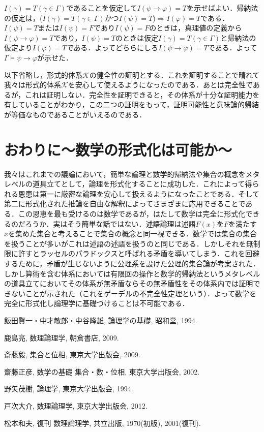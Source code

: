 \documentclass[10pt,b5paper,papersize,dvipdfmx]{jsbook}
\begin{document}
$I(\gamma)=T(\gamma \in \Gamma)$であることを仮定して$I(\psi \to \varphi)=T$を示せばよい．帰納法の仮定は，($I(\gamma)=T(\gamma \in \Gamma)$かつ$I(\psi)=T$)$\Rightarrow$$I(\varphi)=T$である．$I(\psi) = T$または$I(\psi) = F$であり$I(\psi) = F$のときは，真理値の定義から$I(\psi \to \varphi)=T$であり，$I(\psi) = T$のときは仮定$I(\gamma)=T(\gamma \in \Gamma)$と帰納法の仮定より$I(\varphi)=T$である．よってどちらにしろ$I(\psi \to \varphi)=T$である．よって$\Gamma \models \psi \to \varphi$が示せた．\par
以下省略し，形式的体系$\mathcal K$の健全性の証明とする．これを証明することで晴れて我々は形式的体系$\mathcal K$を安心して使えるようになったのである．あとは完全性であるが，これは証明しない．完全性を証明できると，その体系が十分な証明能力を有していることがわかり，この二つの証明をもって，証明可能性と意味論的帰結が等価なものであることがいえるのである．

\section{おわりに～数学の形式化は可能か～}
我々はこれまでの議論において，簡単な論理と数学的帰納法や集合の概念をメタレベルの道具立てとして，論理を形式化することに成功した．これによって得られる恩恵は第一に厳密な論理を安心して扱えるようになったことである．そして第二に形式化された推論を自由な解釈によってさまざまに応用できることである．この恩恵を最も受けるのは数学であるが，はたして数学は完全に形式化できるのだろうか．実はそう簡単な話ではない．述語論理は述語$F(x)$を$F$を満たす$x$を集めた集合と考えることで集合の概念と同一視できる．数学では集合の集合を扱うことが多いがこれは述語の述語を扱うのと同じである．しかしそれを無制限に許すとラッセルのパラドックスと呼ばれる矛盾を導いてしまう．これを回避するために，矛盾が生じないように公理系を設けた公理的集合論が考案された．しかし算術を含む体系においては有限回の操作と数学的帰納法というメタレベルの道具立てにおいてその体系が無矛盾ならその無矛盾性をその体系内では証明できないことが示された（これをゲーデルの不完全性定理という）．よって数学を完全に形式化し論理学に基礎づけることは不可能である．

\begin{thebibliography}{99}
  \item 飯田賢一・中才敏郎・中谷隆雄, 論理学の基礎, 昭和堂, 1994.
  \item 鹿島亮, 数理論理学, 朝倉書店, 2009.
  \item 斎藤毅, 集合と位相, 東京大学出版会, 2009.
  \item 齋藤正彦, 数学の基礎 集合・数・位相, 東京大学出版会, 2002.
  \item 野矢茂樹, 論理学, 東京大学出版会, 1994.
  \item 戸次大介, 数理論理学, 東京大学出版会, 2012.
  \item 松本和夫, 復刊 数理論理学, 共立出版, 1970(初版), 2001(復刊).
\end{thebibliography}
\end{document}
